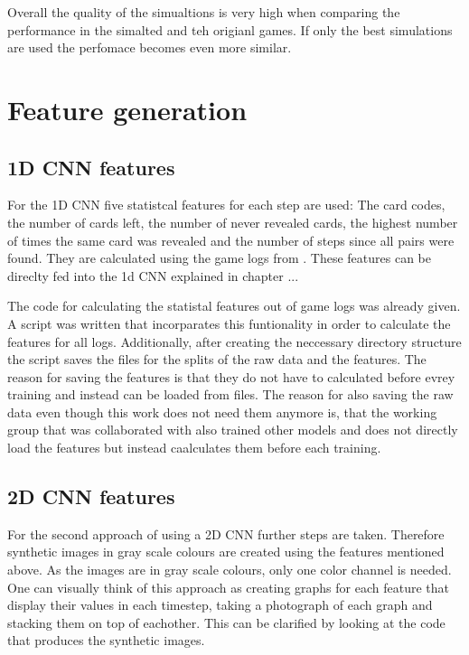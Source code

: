 Overall the quality of the simualtions is very high when comparing the performance in the simalted and teh origianl games. If only the best simulations are used the perfomace becomes even more similar.   

\section{Feature generation}

\subsection{1D CNN features}

For the 1D CNN five statistcal features for each step are used: The card codes, the number of cards left, the number of never revealed cards,  the highest number of times the same card was revealed and the number of steps  since all pairs were found. They are calculated using the game logs from . 
These features can be direclty fed into the 1d CNN explained in chapter ... 

The code for calculating the statistal features out of game logs was already given. A script was written that incorparates this funtionality in order to calculate the features for all logs. Additionally, after creating the neccessary directory structure the script saves the files for the splits of the raw data and the features. The reason for saving the features is that they do not have to calculated before evrey training and instead can be loaded from files. The reason for also saving the raw data even though this work does not need them anymore is, that the working group that was collaborated with also trained other models and does not directly load the features but instead caalculates them before each training. 

\subsection{2D CNN features}

For the second approach of using a 2D CNN further steps are taken. Therefore synthetic images in gray scale colours are created using the features mentioned above. As the images are in gray scale colours, only one color channel is needed. One can visually think of this approach as creating graphs for each feature that display their values in each timestep, taking a photograph of each graph and stacking them on top of eachother. This can be clarified by looking at the code that produces the synthetic images.  

